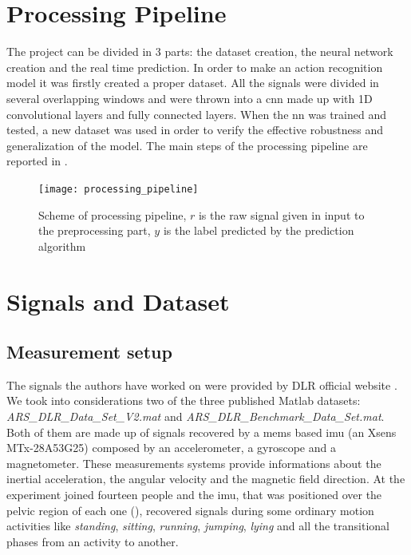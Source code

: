 
\section{Processing Pipeline}
\label{sec:processing_architecture}
The project can be divided in 3 parts: the dataset creation, the neural network creation and the real time prediction.
In order to make an action recognition model it was firstly created a proper dataset. All the signals were divided in several overlapping windows and were thrown into a \gls{cnn} made up with 1D convolutional layers and fully connected layers.
When the \gls{nn} was trained and tested, a new dataset was used in order to verify the effective robustness and generalization of the model.
The main steps of the processing pipeline are reported in .

\begin{figure}[htp]
\texttt{[image: processing\_pipeline]}
\caption{Scheme of processing pipeline, $r$ is the raw signal given in input to the preprocessing part, $y$ is the label predicted by the prediction algorithm}
\label{fig:processing_pipeline}
\end{figure}


\section{Signals and Dataset}
\label{sec:model}

\subsection{Measurement setup}
The signals the authors have worked on were provided by DLR official website \cite{DLR}. We took into considerations two of the three published Matlab datasets: \textit{ARS\_DLR\_Data\_Set\_V2.mat} and \textit{ARS\_DLR\_Benchmark\_Data\_Set.mat}.
Both of them are made up of signals recovered by a \gls{mems} based \gls{imu} (an Xsens MTx-28A53G25) composed by an accelerometer, a gyroscope and a magnetometer. These measurements systems provide informations about the inertial acceleration, the angular velocity and the magnetic field direction.
At the experiment joined fourteen people and the \gls{imu}, that was positioned over the pelvic region of each one (), recovered signals during some ordinary motion activities like \textit{standing}, \textit{sitting}, \textit{running}, \textit{jumping}, \textit{lying} and all the transitional phases from an activity to another.

